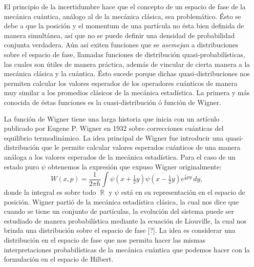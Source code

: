 \documentclass[a4paper]{report}
\DeclareMathOperator{\R}{\mathbb{R}}
\begin{document}
  El principio de la incertidumbre hace que el concepto de
  un espacio de fase de la mecánica cuántica, análogo al de
  la mecánica clásica, sea problemático. Ésto se debe a que
  la posición y el momentum de una partícula no ésta bien
  definida de manera simultánea, así que no se puede definir
  una densidad de probabilidad conjunta verdadera. Aún así
  exiten funciones que se \textit{asemejan} a distribuciones
  sobre el espacio de fase, llamadas funciones de
  distribución quasi-probabilísticas, las cuales son útiles
  de manera práctica, además de vincular de cierta manera a
  la mecánica clásica y la cuántica. Ésto sucede porque
  dichas quasi-distribuciones nos permiten calcular los
  valores esperados de los operadores cuánticos de manera
  muy similar a los promedios clásicos de la mecánica
  estadística. La primera y más conocida de éstas funciones
  es la cuasi-distribución ó función de Wigner.

  La función de Wigner tiene una larga historia que inicia
  con un artículo publicado por Eugene P. Wigner en 1932
  \cite{wignerQuantumCorrectionThermodynamic1932} sobre
  correcciones cuánticas del equilibrio termodinámico. La
  idea principal de Wigner fue introducir una
  quasi-distribución que le permite calcular valores
  esperados cuánticos de una manera análoga a los valores
  esperados de la mecánica estadística. Para el caso de un
  estado puro $\psi$ obtenemos la expresión que expuso
  Wigner originalmente:
  \begin{equation}
    \label{eqn:wigners_original}
    W(x,p)
    = \frac{1}{2\pi\hbar} \int
    \psi(x+\tfrac{1}{2}y)\overline{\psi(x-\tfrac{1}{2}y)}
    e^{\frac{i}{\hbar} p y} \, dy,
  \end{equation}
  donde la integral es sobre todo $\R$ y $\psi$ está en su
  representación en el espacio de posición. Wigner partió de
  la mecánica estadística clásica, la cual nos dice que
  cuando se tiene un conjunto de partículas, la evolución
  del sistema puede ser estudiado de manera probabilística
  mediante la ecuación de Liouville, la cual nos brinda una
  distribución sobre el espacio de fase [?]. La idea es
  considerar una distribución en el espacio de fase que nos
  permita hacer las mismas interpretaciones probabilísticas
  de la mecánica cuántica que podemos hacer con la
  formulación en el espacio de Hilbert.
\end{document}
